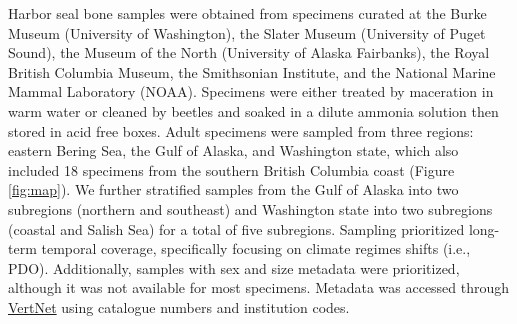 \documentclass [11pt, proquest] {uwthesis}[2015/03/03]
\begin{document}
Harbor seal bone samples were obtained from specimens curated at the Burke Museum (University of Washington), the Slater Museum (University of Puget Sound), the Museum of the North (University of Alaska Fairbanks), the Royal British Columbia Museum, the Smithsonian Institute, and the National Marine Mammal Laboratory (NOAA). Specimens were either treated by maceration in warm water or cleaned by beetles and soaked in a dilute ammonia solution then stored in acid free boxes. Adult specimens were sampled from three regions: eastern Bering Sea, the Gulf of Alaska, and Washington state, which also included 18 specimens from the southern British Columbia coast (Figure \ref{fig:map}). We further stratified samples from the Gulf of Alaska into two subregions (northern and southeast) and Washington state into two subregions (coastal and Salish Sea) for a total of five subregions. Sampling prioritized long-term temporal coverage, specifically focusing on climate regimes shifts (i.e., PDO). Additionally, samples with sex and size metadata were prioritized, although it was not available for most specimens. Metadata was accessed through \href{http://www.vertnet.org/index.html}{VertNet} using catalogue numbers and institution codes.
\end{document}
